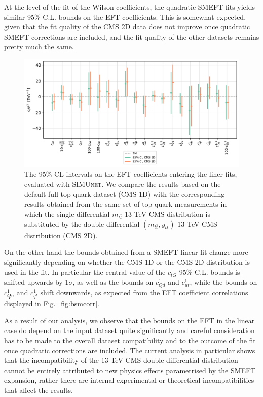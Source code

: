 \documentclass[withindex,glossary]{cam-thesis}
\newcommand{\simunet}{\textsc{SIMUnet}}
\begin{document}
At the level of the fit of the Wilson coefficients, the quadratic SMEFT
fits yields similar 95\% C.L. bounds on the EFT coefficients. This is
somewhat expected, given that the fit quality of the CMS 2D data does not improve once quadratic SMEFT
corrections are included, and the fit quality of the other datasets remains pretty much the same.
%
\begin{figure}[htb]
        \centering
        \includegraphics[scale=0.7]{smeft_plots/smeft_lin_lo_cms2d_cms1d.pdf}
	\caption{The 95\% CL intervals on the EFT coefficients entering the liner fits,
          evaluated with \simunet.
          We compare the results based on the default full top quark dataset (CMS 1D) with
          the corresponding results obtained from the same set of top quark
          measurements in which the single-differential $m_{t\bar{t}}$ 13 TeV CMS distribution is substituted by the
          double differential  $(m_{t\bar{t}},y_{t\bar{t}})$ 13 TeV CMS distribution (CMS 2D).        
        }
	\label{fig:linear_eft_cms2d_cms1d}
      \end{figure}
%
On the other hand the bounds obtained from a SMEFT linear fit change
more significantly depending on whether the CMS 1D or the CMS 2D
distribution is used in the fit.
In particular the central value of the $c_{tG}$ 95\% C.L. bounds is
shifted upwards by 1$\sigma$, as well as the bounds on $c^1_{Qd}$ and
$c^1_{ut}$, while the bounds on $c^1_{Qu}$ and
$c^1_{qt}$ shift downwards, as expected from the EFT coefficient
correlations displayed in Fig.~\ref{fig:bsmcorr}.

As a result of our analysis, we observe that the bounds on the EFT in
the linear case do depend on the input dataset quite significantly and
careful consideration has to be made to the overall dataset
compatibility and to the outcome of the fit once quadratic corrections
are included. The current analysis in particular shows that the
incompatibility of the 13 TeV CMS double differential distribution
cannot be entirely attributed to new physics effects parametrised by
the SMEFT expansion, rather there are internal experimental or
theoretical incompatibilities that affect the results.
\end{document}
